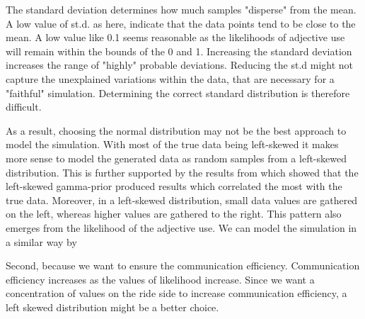 \documentclass[11pt,a4paper,oneside]{article}
\begin{document}
The standard deviation determines how much samples "disperse" from the mean. A low value of st.d. as here, indicate that the data points tend to be close to the mean. A low value like 0.1 seems reasonable as the likelihoods of adjective use will remain within the bounds of the 0 and 1. Increasing the standard deviation increases the range of "highly" probable deviations. Reducing the st.d might not capture the unexplained variations within the data, that are necessary for a "faithful" simulation. Determining the correct standard distribution is therefore difficult.  


As a result, choosing the normal distribution may not be the best approach to model the simulation. With most of the true data being left-skewed it makes more sense to model the generated data as random samples from a left-skewed distribution. This is further supported by the results from  which showed that the left-skewed gamma-prior produced results which correlated the most with the true data.
Moreover, in a left-skewed distribution, small data values are gathered on the left, whereas higher values are gathered to the right. This pattern also emerges from the likelihood of the adjective use. We can model the simulation in a similar way by 





Second, because we want to ensure the communication efficiency.  Communication efficiency increases as the values of likelihood increase. Since we want a concentration of values on the ride side to increase communication efficiency, a left skewed distribution might be a better choice.

\clearpage 
\printbibliography
\end{document}
